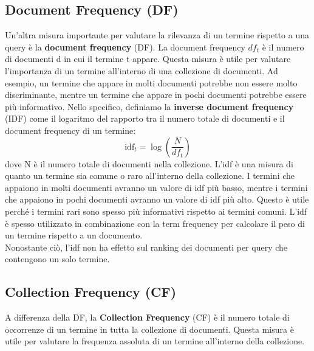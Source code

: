 \documentclass{report}
\begin{document}
	\subsection{Document Frequency (DF)}
	Un'altra misura importante per valutare la rilevanza di un termine rispetto a una query è la \textbf{document frequency} (DF). La document frequency $df_t$ è il numero di documenti d in cui il termine t appare. Questa misura è utile per valutare l'importanza di un termine all'interno di una collezione di documenti. Ad esempio, un termine che appare in molti documenti potrebbe non essere molto discriminante, mentre un termine che appare in pochi documenti potrebbe essere più informativo. Nello specifico, definiamo la \textbf{inverse document frequency} (IDF) come il logaritmo del rapporto tra il numero totale di documenti e il document frequency di un termine:
	\[
	\text{idf}_t = \log\left(\frac{N}{df_t}\right)
	\]
	dove N è il numero totale di documenti nella collezione. L'idf è una misura di quanto un termine sia comune o raro all'interno della collezione. I termini che appaiono in molti documenti avranno un valore di idf più basso, mentre i termini che appaiono in pochi documenti avranno un valore di idf più alto. Questo è utile perché i termini rari sono spesso più informativi rispetto ai termini comuni. L'idf è spesso utilizzato in combinazione con la term frequency per calcolare il peso di un termine rispetto a un documento.
	\vspace{\baselineskip}\\
	Nonostante ciò, l'idf non ha effetto sul ranking dei documenti per query che contengono un solo termine.

	\subsection{Collection Frequency (CF)}
	A differenza della DF, la \textbf{Collection Frequency} (CF) è il numero totale di occorrenze di un termine in tutta la collezione di documenti. Questa misura è utile per valutare la frequenza assoluta di un termine all'interno della collezione. 
\end{document}
